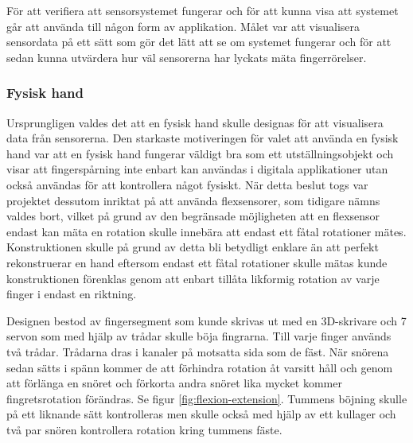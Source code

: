 \documentclass[a4paper]{article}
\begin{document}
\begin{sloppypar}
  För att verifiera att sensorsystemet fungerar och för att kunna visa att systemet går att använda till någon form av applikation.
  Målet var att visualisera sensordata på ett sätt som gör det lätt att se om systemet fungerar och för att sedan kunna utvärdera hur väl sensorerna har lyckats mäta fingerrörelser.


  \subsubsection{Fysisk hand}
  Ursprungligen valdes det att en fysisk hand skulle designas för att visualisera data från sensorerna.
  Den starkaste motiveringen för valet att använda en fysisk hand var att en fysisk hand fungerar väldigt bra som ett utställningsobjekt
  och visar att fingerspårning inte enbart kan användas i digitala applikationer utan också användas för att kontrollera något fysiskt.
  När detta beslut togs var projektet dessutom inriktat på att använda flexsensorer, som tidigare nämns valdes bort,
  vilket på grund av den begränsade möjligheten att en flexsensor endast kan mäta en rotation skulle innebära att endast ett fåtal rotationer mätes.
  Konstruktionen skulle på grund av detta bli betydligt enklare än att perfekt rekonstruerar en hand eftersom
  endast ett fåtal rotationer skulle mätas kunde konstruktionen förenklas genom att enbart tillåta likformig rotation av varje finger i endast en riktning.

  Designen bestod av fingersegment som kunde skrivas ut med en 3D-skrivare och 7 servon som med hjälp av trådar skulle böja fingrarna.
  Till varje finger används två trådar. Trådarna dras i kanaler på motsatta sida som de fäst.
  När snörena sedan sätts i spänn kommer de att förhindra rotation åt varsitt håll och genom att förlänga en snöret och förkorta andra snöret lika mycket kommer fingretsrotation förändras. Se figur \ref{fig:flexion-extension}.
  Tummens böjning skulle på ett liknande sätt kontrolleras men skulle också med hjälp av ett kullager och två par snören kontrollera rotation kring tummens fäste.



\end{sloppypar}
\end{document}
